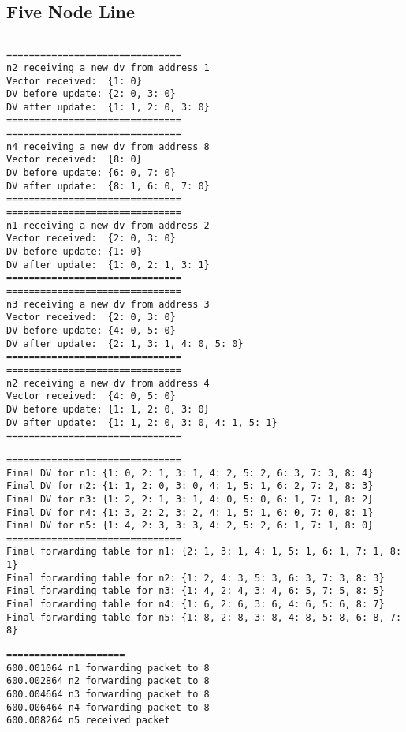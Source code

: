 \documentclass[11pt]{article}
\begin{document}
\subsection{Five Node Line}
  
 \begin{lstlisting} 

 \end{lstlisting}

 \begin{lstlisting} 
===============================
n2 receiving a new dv from address 1
Vector received:  {1: 0}
DV before update: {2: 0, 3: 0}
DV after update:  {1: 1, 2: 0, 3: 0}
===============================
===============================
n4 receiving a new dv from address 8
Vector received:  {8: 0}
DV before update: {6: 0, 7: 0}
DV after update:  {8: 1, 6: 0, 7: 0}
===============================
===============================
n1 receiving a new dv from address 2
Vector received:  {2: 0, 3: 0}
DV before update: {1: 0}
DV after update:  {1: 0, 2: 1, 3: 1}
===============================
===============================
n3 receiving a new dv from address 3
Vector received:  {2: 0, 3: 0}
DV before update: {4: 0, 5: 0}
DV after update:  {2: 1, 3: 1, 4: 0, 5: 0}
===============================
===============================
n2 receiving a new dv from address 4
Vector received:  {4: 0, 5: 0}
DV before update: {1: 1, 2: 0, 3: 0}
DV after update:  {1: 1, 2: 0, 3: 0, 4: 1, 5: 1}
===============================
\end{lstlisting}

 \begin{lstlisting} 
===============================
Final DV for n1: {1: 0, 2: 1, 3: 1, 4: 2, 5: 2, 6: 3, 7: 3, 8: 4}
Final DV for n2: {1: 1, 2: 0, 3: 0, 4: 1, 5: 1, 6: 2, 7: 2, 8: 3}
Final DV for n3: {1: 2, 2: 1, 3: 1, 4: 0, 5: 0, 6: 1, 7: 1, 8: 2}
Final DV for n4: {1: 3, 2: 2, 3: 2, 4: 1, 5: 1, 6: 0, 7: 0, 8: 1}
Final DV for n5: {1: 4, 2: 3, 3: 3, 4: 2, 5: 2, 6: 1, 7: 1, 8: 0}
===============================
Final forwarding table for n1: {2: 1, 3: 1, 4: 1, 5: 1, 6: 1, 7: 1, 8: 1}
Final forwarding table for n2: {1: 2, 4: 3, 5: 3, 6: 3, 7: 3, 8: 3}
Final forwarding table for n3: {1: 4, 2: 4, 3: 4, 6: 5, 7: 5, 8: 5}
Final forwarding table for n4: {1: 6, 2: 6, 3: 6, 4: 6, 5: 6, 8: 7}
Final forwarding table for n5: {1: 8, 2: 8, 3: 8, 4: 8, 5: 8, 6: 8, 7: 8}
\end{lstlisting}

 \begin{lstlisting} 
=====================
600.001064 n1 forwarding packet to 8
600.002864 n2 forwarding packet to 8
600.004664 n3 forwarding packet to 8
600.006464 n4 forwarding packet to 8
600.008264 n5 received packet
\end{lstlisting}
\end{document}
